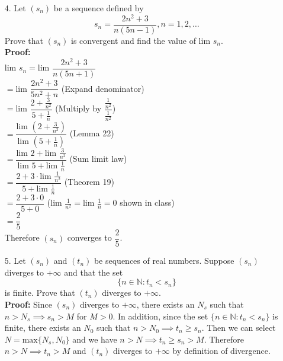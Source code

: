 \documentclass{article}
\begin{document}
\newpage
\begin{itemize}
    \item [4.] Let $(s_n)$ be a sequence defined by \[s_n=\dfrac{2n^2+3}{n(5n-1)}, n=1,2,\ldots\] Prove that $(s_n)$ is convergent and find the value of $\text{lim }s_n$.\\
          \textbf{Proof:}\\$\text{lim }s_n=\text{lim }\dfrac{2n^2+3}{n(5n+1)}$\\$=\text{lim }\dfrac{2n^2+3}{5n^2+n}$ (Expand denominator)\\$=\text{lim }\dfrac{2+\frac{3}{n^2}}{5+\frac{1}{n}}$ (Multiply by $\dfrac{\frac{1}{n^2}}{\frac{1}{n^2}}$)\\$=\dfrac{\text{lim }(2+\frac{3}{n^2})}{\text{lim }(5+\frac{1}{n})}$ (Lemma 22)\\$=\dfrac{\text{lim }2+\text{lim }\frac{3}{n^2}}{\text{lim }5+\text{lim }\frac{1}{n}}$ (Sum limit law)\\$=\dfrac{2+3\cdot\text{lim }\frac{1}{n^2}}{5+\text{lim }\frac{1}{n}}$ (Theorem 19)\\$=\dfrac{2+3\cdot 0}{5+0}$ ($\text{lim }\frac{1}{n^2}=\text{lim }\frac{1}{n}=0$ shown in class)\\$=\dfrac{2}{5}$\\Therefore $(s_n)$ converges to $\dfrac{2}{5}$.

\end{itemize}
\newpage
\begin{itemize}
    \item [5.] Let $(s_n)$ and $(t_n)$ be sequences of real numbers. Suppose $(s_n)$ diverges to $+\infty$ and that the set \[\{n\in\mathbb{N}:t_n<s_n\}\] is finite. Prove that $(t_n)$ diverges to $+\infty$.\\
          \textbf{Proof:} Since $(s_n)$ diverges to $+\infty$, there exists an $N_s$ such that $n>N_s\implies s_n>M$ for $M>0$. In addition, since the set $\{n\in\mathbb{N}:t_n<s_n\}$ is finite, there exists an $N_0$ such that $n>N_0\implies t_n\geq s_n$. Then we can select $N=\text{max}\{N_s,N_0\}$ and we have $n>N\implies t_n\geq s_n>M$. Therefore $n>N\implies t_n>M$ and $(t_n)$ diverges to $+\infty$ by definition of divergence.
\end{itemize}
\end{document}
